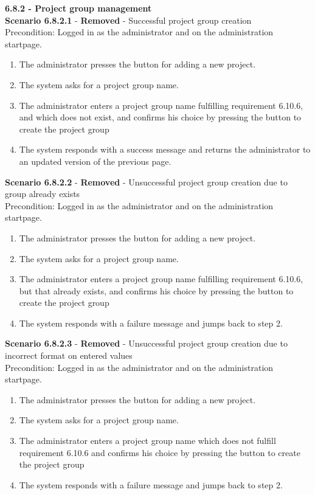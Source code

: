 \documentclass{article}
\begin{document}
\noindent
{\fontsize{11}{11}\selectfont \noindent\textbf{6.8.2 - Project group management}} \\
\noindent\textbf{Scenario 6.8.2.1} - \textbf{Removed} - Successful project group creation \\
Precondition: Logged in as the administrator and on the administration startpage.
\begin{enumerate}
\item The administrator presses the button for adding a new project.
\item The system asks for a project group name.
\item The administrator enters a project group name fulfilling requirement 6.10.6, and which does not exist, and confirms his choice by pressing the button to create the project group
\item The system responds with a success message and returns the administrator to an updated version of the previous page.
\end{enumerate}

\noindent\textbf{Scenario 6.8.2.2} - \textbf{Removed} - Unsuccessful project group creation due to group already exists \\
Precondition: Logged in as the administrator and on the administration startpage.
\begin{enumerate}
\item The administrator presses the button for adding a new project.
\item The system asks for a project group name.
\item The administrator enters a project group name fulfilling requirement 6.10.6, but that already exists, and confirms his choice by pressing the button to create the project group
\item The system responds with a failure message and jumps back to step 2.
\end{enumerate}

\noindent\textbf{Scenario 6.8.2.3} - \textbf{Removed} - Unsuccessful project group creation due to incorrect format on entered values\\
Precondition: Logged in as the administrator and on the administration startpage.
\begin{enumerate}
\item The administrator presses the button for adding a new project.
\item The system asks for a project group name.
\item The administrator enters a project group name which does not fulfill requirement 6.10.6 and confirms his choice by pressing the button to create the project group
\item The system responds with a failure message and jumps back to step 2.
\end{enumerate}
\end{document}
